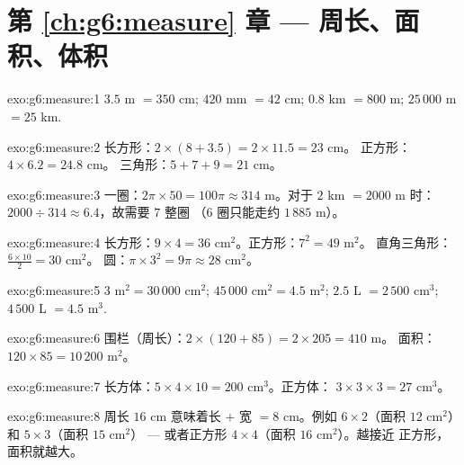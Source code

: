 \section*{第 \ref{ch:g6:measure} 章 --- 周长、面积、体积}

\begin{solution}{exo:g6:measure:1}
$3.5$ m $= 350$ cm; \quad $420$ mm $= 42$ cm; \quad
$0.8$ km $= 800$ m; \quad $25\,000$ m $= 25$ km.
\end{solution}

\begin{solution}{exo:g6:measure:2}
长方形：$2 \times (8 + 3.5) = 2 \times 11.5 = 23$ cm。
正方形：$4 \times 6.2 = 24.8$ cm。
三角形：$5 + 7 + 9 = 21$ cm。
\end{solution}

\begin{solution}{exo:g6:measure:3}
一圈：$2\pi \times 50 = 100\pi \approx 314$ m。对于 $2$ km
$= 2000$ m 时：$2000 \div 314 \approx 6.4$，故需要 $7$ 整圈
（$6$ 圈只能走约 $1\,885$ m）。
\end{solution}

\begin{solution}{exo:g6:measure:4}
长方形：$9 \times 4 = 36$ cm$^2$。正方形：$7^2 = 49$ m$^2$。
直角三角形：$\frac{6 \times 10}{2} = 30$ cm$^2$。
圆：$\pi \times 3^2 = 9\pi \approx 28$ cm$^2$。
\end{solution}

\begin{solution}{exo:g6:measure:5}
$3$ m$^2 = 30\,000$ cm$^2$; \quad
$45\,000$ cm$^2 = 4.5$ m$^2$; \quad
$2.5$ L $= 2\,500$ cm$^3$; \quad
$4\,500$ L $= 4.5$ m$^3$.
\end{solution}

\begin{solution}{exo:g6:measure:6}
围栏（周长）：$2 \times (120 + 85) = 2 \times 205 = 410$ m。
面积：$120 \times 85 = 10\,200$ m$^2$。
\end{solution}

\begin{solution}{exo:g6:measure:7}
长方体：$5 \times 4 \times 10 = 200$ cm$^3$。正方体：
$3 \times 3 \times 3 = 27$ cm$^3$。
\end{solution}

\begin{solution}{exo:g6:measure:8}
周长 $16$ cm 意味着长 $+$ 宽 $= 8$ cm。例如
$6 \times 2$（面积 $12$ cm$^2$）和 $5 \times 3$（面积 $15$ cm$^2$）
--- 或者正方形 $4 \times 4$（面积 $16$ cm$^2$）。越接近
正方形，面积就越大。
\end{solution}

